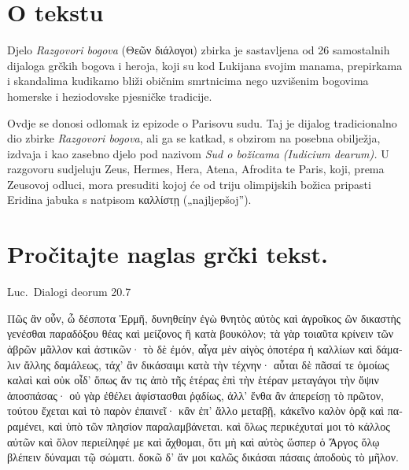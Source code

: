 


\section*{O tekstu}

Djelo \textit{Razgovori bogova} \textgreek[variant=ancient]{(Θεῶν διάλογοι)} zbirka je sastavljena od 26 samostalnih dijaloga grčkih bogova i heroja, koji su kod Lukijana svojim manama, prepirkama i skandalima kudikamo bliži običnim smrtnicima nego uzvišenim bogovima homerske i heziodovske pjesničke tradicije. 

Ovdje se donosi odlomak iz epizode o Parisovu sudu. Taj je dijalog tradicionalno dio zbirke \textit{Razgovori bogova}, ali ga se katkad, s obzirom na posebna obilježja, izdvaja i kao zasebno djelo pod nazivom \textit{Sud o božicama (Iudicium dearum).} U razgovoru sudjeluju Zeus, Hermes, Hera, Atena, Afrodita te Paris, koji, prema Zeusovoj odluci, mora presuditi kojoj će od triju olimpijskih božica pripasti Eridina jabuka s natpisom \textgreek[variant=ancient]{καλλίστῃ} („najljepšoj'').


\section*{Pročitajte naglas grčki tekst.}


Luc.\ Dialogi deorum 20.7

\medskip

{\large
\begin{greek}
\noindent Πῶς ἂν οὖν, ὦ δέσποτα  Ἑρμῆ, δυνηθείην ἐγὼ θνητὸς αὐτὸς καὶ ἀγροῖκος ὢν δικαστὴς γενέσθαι παραδόξου θέας καὶ μείζονος ἢ κατὰ βουκόλον; τὰ γὰρ τοιαῦτα κρίνειν τῶν ἁβρῶν μᾶλλον καὶ ἀστικῶν· τὸ δὲ ἐμόν, αἶγα μὲν αἰγὸς ὁποτέρα ἡ καλλίων καὶ δάμαλιν ἄλλης δαμάλεως, τάχ' ἂν δικάσαιμι κατὰ τὴν τέχνην· αὗται δὲ πᾶσαί τε ὁμοίως καλαὶ καὶ οὐκ οἶδ' ὅπως ἄν τις ἀπὸ τῆς ἑτέρας ἐπὶ τὴν ἑτέραν μεταγάγοι τὴν ὄψιν ἀποσπάσας· οὐ γὰρ ἐθέλει ἀφίστασθαι ῥᾳδίως, ἀλλ' ἔνθα ἂν ἀπερείσῃ τὸ πρῶτον, τούτου ἔχεται καὶ τὸ παρὸν ἐπαινεῖ· κἂν ἐπ' ἄλλο μεταβῇ, κἀκεῖνο καλὸν ὁρᾷ καὶ παραμένει, καὶ ὑπὸ τῶν πλησίον παραλαμβάνεται. καὶ ὅλως περικέχυταί μοι τὸ κάλλος αὐτῶν καὶ ὅλον περιείληφέ με καὶ ἄχθομαι, ὅτι μὴ καὶ αὐτὸς ὥσπερ ὁ Ἄργος ὅλῳ βλέπειν δύναμαι τῷ σώματι. δοκῶ δ' ἄν μοι καλῶς δικάσαι πάσαις ἀποδοὺς τὸ μῆλον.

\end{greek}

}


